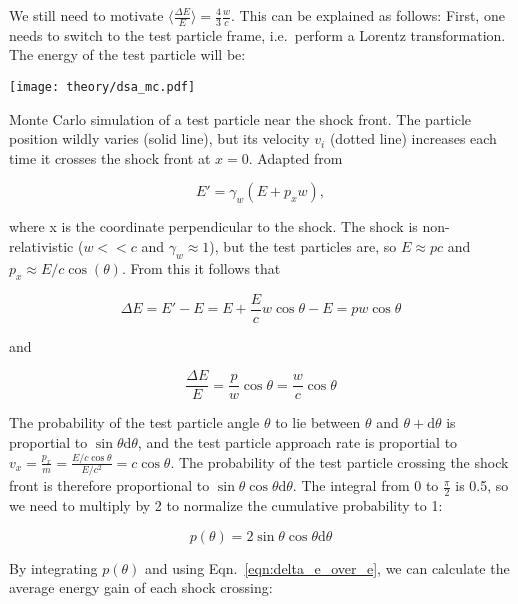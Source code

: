 We still need to motivate $\big\langle\frac{\Delta E}{E}\big\rangle = \frac{4}{3}\frac{w}{c}$. This can be explained as follows: First, one needs to switch to the test particle frame, i.e.\ perform a Lorentz transformation. The energy of the test particle will be:

\begin{marginfigure}
    \texttt{[image: theory/dsa\_mc.pdf]}
    \caption[DSA Monte Carlo]{Monte Carlo simulation of a test particle near the shock front. The particle position wildly varies (solid line), but its velocity $v_i$ (dotted line) increases each time it crosses the shock front at $x=0$. Adapted from~\cite{Baring1997}}
\end{marginfigure}

\begin{equation}
    E' = \gamma_{w}(E+p_x w),
\end{equation}

where x is the coordinate perpendicular to the shock. The shock is non-relativistic ($w<<c$ and $\gamma_w\approx1$), but the test particles are, so $E\approx pc$ and $p_x \approx E/c \cos(\theta)$. From this it follows that

\begin{equation}
    \Delta E = E' - E = E+\frac{E}{c}w\cos{\theta}-E = pw\cos{\theta}
\end{equation}

and

\begin{equation}
    \frac{\Delta E}{E} = \frac{p}{w}\cos{\theta} = \frac{w}{c}\cos{\theta}
    \label{eqn:delta_e_over_e}
\end{equation}

The probability of the test particle angle $\theta$ to lie between $\theta$ and $\theta + \text{d}\theta$ is proportial to $\sin{\theta}\text{d}\theta$, and the test particle approach rate is proportial to $v_x = \frac{p_x}{m} = \frac{E/c\cos{\theta}}{E/c^2} = c \cos{\theta}$. The probability of the test particle crossing the shock front is therefore proportional to $\sin{\theta} \cos{\theta} \text{d}\theta$. The integral from 0 to $\frac{\pi}{2}$ is 0.5, so we need to multiply by 2 to normalize the cumulative probability to 1:

\begin{equation}
    p(\theta) = 2\sin{\theta}\cos{\theta} \text{d}\theta
\end{equation}

By integrating $p(\theta)$ and using Eqn.~\ref{eqn:delta_e_over_e}, we can calculate the average energy gain of each shock crossing:

